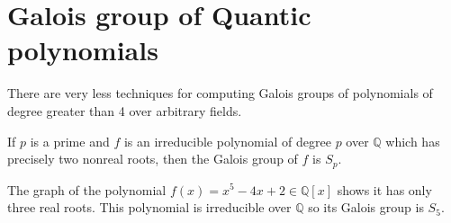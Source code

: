 \section{Galois group of Quantic polynomials}
There are very less techniques for computing Galois groups of polynomials of degree greater than 4 over arbitrary fields.

\begin{theorem}
If \(p\) is a prime and \(f\) is an irreducible polynomial of degree \(p\) over \(\mathbb{Q}\) which has precisely two nonreal roots, then the Galois group of \(f\) is \(S_p\).
\end{theorem}

\begin{example}
The graph of the polynomial \(f(x)=x^5-4x+2 \in \mathbb{Q}[x]\) shows it has only three real roots. This polynomial is irreducible over \(\mathbb{Q}\) so its Galois group is \(S_5\). 
\end{example}

